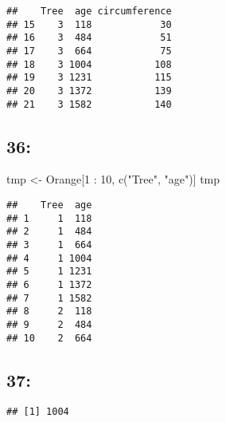 \documentclass[
]{article}
\newenvironment{Shaded}{\begin{snugshade}}{\end{snugshade}}
\newcommand{\DecValTok}[1]{\textcolor[rgb]{0.00,0.00,0.81}{#1}}
\newcommand{\FunctionTok}[1]{\textcolor[rgb]{0.00,0.00,0.00}{#1}}
\newcommand{\NormalTok}[1]{#1}
\newcommand{\OtherTok}[1]{\textcolor[rgb]{0.56,0.35,0.01}{#1}}
\newcommand{\SpecialCharTok}[1]{\textcolor[rgb]{0.00,0.00,0.00}{#1}}
\newcommand{\StringTok}[1]{\textcolor[rgb]{0.31,0.60,0.02}{#1}}
\begin{document}
\begin{Shaded}
\end{Shaded}

\begin{verbatim}
##    Tree  age circumference
## 15    3  118            30
## 16    3  484            51
## 17    3  664            75
## 18    3 1004           108
## 19    3 1231           115
## 20    3 1372           139
## 21    3 1582           140
\end{verbatim}

\hypertarget{section-35}{%
\subsection{36:}\label{section-35}}

\begin{Shaded}
\begin{Highlighting}[]
\NormalTok{tmp }\OtherTok{\textless{}{-}}\NormalTok{ Orange[}\DecValTok{1} \SpecialCharTok{:} \DecValTok{10}\NormalTok{, }\FunctionTok{c}\NormalTok{(}\StringTok{"Tree"}\NormalTok{, }\StringTok{"age"}\NormalTok{)]}
\NormalTok{tmp}
\end{Highlighting}
\end{Shaded}

\begin{verbatim}
##    Tree  age
## 1     1  118
## 2     1  484
## 3     1  664
## 4     1 1004
## 5     1 1231
## 6     1 1372
## 7     1 1582
## 8     2  118
## 9     2  484
## 10    2  664
\end{verbatim}

\hypertarget{section-36}{%
\subsection{37:}\label{section-36}}

\begin{Shaded}
\end{Shaded}

\begin{verbatim}
## [1] 1004
\end{verbatim}
\end{document}
